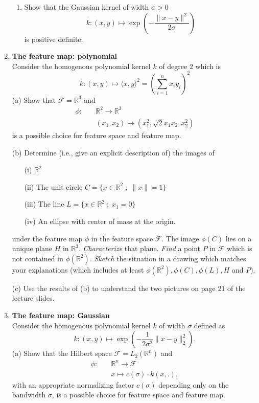 \documentclass[a4paper,10pt,oneside]{article}
\begin{document}
\begin{enumerate}
\begin{enumerate}
\item Show that the Gaussian kernel of width $\sigma> 0$
         $$ k: (x,y)\mapsto \exp\left( -\frac{\|x-y\|^2}{2\sigma}\right)$$
is positive definite.
\end{enumerate}


\item {\bf The feature map: polynomial}\\
 Consider the homogenous polynomial kernel $k$ of degree $2$ which is
  $$k :(x,y) \mapsto  \langle x,y \rangle^2 = \left(\sum_{i=1}^n x_iy_i\right)^2$$
(a) Show that $\mathcal{F}=\mathbb{R}^3$ and
\begin{align*}
  \phi :\quad  &\mathbb{R}^2\longrightarrow \mathbb{R}^3\\
   &(x_1,x_2) \mapsto  (x_1^2,\sqrt{2}x_1x_2,x_2^2)
\end{align*}
is a possible choice for feature space and feature map.

(b) Determine (i.e., give an explicit description of) the images of
\begin{enumerate}
  \item[(i)] $\mathbb{R}^2$
  \item[(ii)] The unit circle $C=\{x\in\mathbb{R}^2\;;\;\|x\|=1\}$
  \item[(iii)] The line $L=\{x\in\mathbb{R}^2\;;\;x_1=0\}$
  \item[(iv)] An ellipse with center of mass at the origin.
\end{enumerate}
under the feature map $\phi$ in the feature space $\mathcal{F}.$
The image $\phi (C)$ lies on a unique plane $H$ in $\mathbb{R}^3$. {\it Characterize} that plane.
{\it Find} a point $P$ in $\mathcal{F}$ which is not contained in $\phi(\mathbb{R}^2).$
{\it Sketch} the situation in a drawing which matches your explanations (which includes at least $\phi (\mathbb{R}^2), \phi (C), \phi(L), H$ and $P$).

(c) Use the results of (b) to understand the two pictures on page 21 of the lecture slides.


\item {\bf The feature map: Gaussian}\\
Consider the homogenous polynomial kernel $k$ of width $\sigma$ defined as
  $$k :(x,y) \mapsto  \exp \left(-\frac{1}{2\sigma^2}\|x-y\|^2_2\right).$$
(a) Show that the Hilbert space $\mathcal{F}= L_2(\mathbb{R}^n)$ and
\begin{align*}
  \phi :\quad  &\mathbb{R}^n\longrightarrow \mathcal{F}\\
   &x \mapsto  c(\sigma)\cdot k(x,.),
\end{align*}
with an appropriate normalizing factor $c(\sigma)$ depending only on the bandwidth $\sigma$,
is a possible choice for feature space and feature map.


\end{enumerate}
\end{document}
